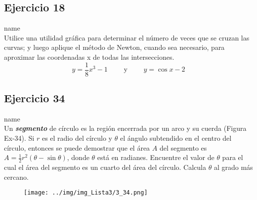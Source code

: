 \documentclass[12pt]{article}
\begin{document}
\subsection{Ejercicio 18} name \\

Utilice una utilidad gráfica para determinar el número de veces que se cruzan las curvas; y luego aplique el método de Newton, cuando sea necesario, para aproximar las coordenadas x de todas las intersecciones.
\[
y=\frac{1}{8}x^3-1 \qquad \text{ y } \qquad y=\cos{x}-2
\]

\subsection{Ejercicio 34} name \\

Un \textit{\textbf{segmento}} de círculo es la región encerrada por un arco y su cuerda (Figura Ex-34). Si $r$ es el radio del círculo y $\theta$ el ángulo subtendido en el centro del círculo, entonces se puede demostrar que el área $A$ del segmento es $A = \frac{1}{2} r^2 (\theta - \sin{\theta})$, donde $\theta$ está en radianes. Encuentre el valor de $\theta$ para el cual el área del segmento es un cuarto del área del círculo. Calcula $\theta$ al grado más cercano.

\begin{figure}[H]
\centering
\texttt{[image: ../img/img\_Lista3/3\_34.png]}
\end{figure}
\end{document}
